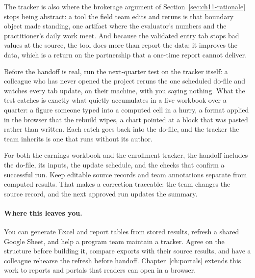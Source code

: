 \documentclass[
    a4paper,
    fontsize=10pt,
    twoside=true,
    numbers=noenddot,
]{kaobook}
\begin{document}
The tracker is also where the brokerage argument of Section~\ref{sec:ch11-rationale} stops being abstract: a tool the field team edits and reruns is that boundary object made standing, one artifact where the evaluator's numbers and the practitioner's daily work meet. And because the validated entry tab stops bad values at the source, the tool does more than report the data; it improves the data, which is a return on the partnership that a one-time report cannot deliver.

Before the handoff is real, run the next-quarter test on the tracker itself: a colleague who has never opened the project reruns the one scheduled do-file and watches every tab update, on their machine, with you saying nothing. What the test catches is exactly what quietly accumulates in a live workbook over a quarter: a figure someone typed into a computed cell in a hurry, a format applied in the browser that the rebuild wipes, a chart pointed at a block that was pasted rather than written. Each catch goes back into the do-file, and the tracker the team inherits is one that runs without its author.

For both the earnings workbook and the enrollment tracker, the handoff includes the do-file, its inputs, the update schedule, and the checks that confirm a successful run. Keep editable source records and team annotations separate from computed results. That makes a correction traceable: the team changes the source record, and the next approved run updates the summary.

\paragraph{Where this leaves you.} You can generate Excel and report tables from stored results, refresh a shared Google Sheet, and help a program team maintain a tracker. Agree on the structure before building it, compare exports with their source results, and have a colleague rehearse the refresh before handoff. Chapter~\ref{ch:portals} extends this work to reports and portals that readers can open in a browser.
\end{document}
